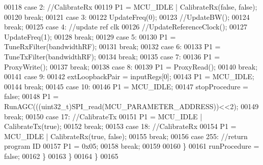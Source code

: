 \begin{DoxyCode}
00118             \textcolor{keywordflow}{case} 2: \textcolor{comment}{//CalibrateRx}
00119                 P1 = MCU_IDLE | CalibrateRx(\textcolor{keyword}{false}, \textcolor{keyword}{false});
00120                 \textcolor{keywordflow}{break};
00121             \textcolor{keywordflow}{case} 3:
00122                 UpdateFreq(0);
00123                 \textcolor{comment}{//UpdateBW();}
00124                 \textcolor{keywordflow}{break};
00125             \textcolor{keywordflow}{case} 4: \textcolor{comment}{//update ref clk}
00126                 \textcolor{comment}{//UpdateReferenceClock();}
00127                 UpdateFreq(1);
00128                 \textcolor{keywordflow}{break};
00129             \textcolor{keywordflow}{case} 5:
00130                 P1 = TuneRxFilter(bandwidthRF);
00131                 \textcolor{keywordflow}{break};
00132             \textcolor{keywordflow}{case} 6:
00133                 P1 = TuneTxFilter(bandwidthRF);
00134                 \textcolor{keywordflow}{break};
00135             \textcolor{keywordflow}{case} 7:
00136                 P1 = ProxyWrite();
00137                 \textcolor{keywordflow}{break};
00138             \textcolor{keywordflow}{case} 8:
00139                 P1 = ProxyRead();
00140                 \textcolor{keywordflow}{break};
00141             \textcolor{keywordflow}{case} 9:
00142                 extLoopbackPair = inputRegs[0];
00143                 P1 = MCU_IDLE;
00144                 \textcolor{keywordflow}{break};
00145             \textcolor{keywordflow}{case} 10:
00146                 P1 = MCU_IDLE;
00147                 stopProcedure = \textcolor{keyword}{false};
00148                 P1 = RunAGC(((uint32\_t)SPI_read(MCU_PARAMETER_ADDRESS))<<2);
00149                 \textcolor{keywordflow}{break};
00150             \textcolor{keywordflow}{case} 17: \textcolor{comment}{//CalibrateTx}
00151                 P1 = MCU_IDLE | CalibrateTx(\textcolor{keyword}{true});
00152                 \textcolor{keywordflow}{break};
00153             \textcolor{keywordflow}{case} 18: \textcolor{comment}{//CalibrateRx}
00154                 P1 = MCU_IDLE | CalibrateRx(\textcolor{keyword}{true}, \textcolor{keyword}{false});
00155                 \textcolor{keywordflow}{break};
00156             \textcolor{keywordflow}{case} 255: \textcolor{comment}{//return program ID}
00157                 P1 = 0x05;
00158                 \textcolor{keywordflow}{break};
00159 
00160             \}
00161             runProcedure = \textcolor{keyword}{false};
00162         \}
00163     \}
00164 \}
00165 
\end{DoxyCode}
